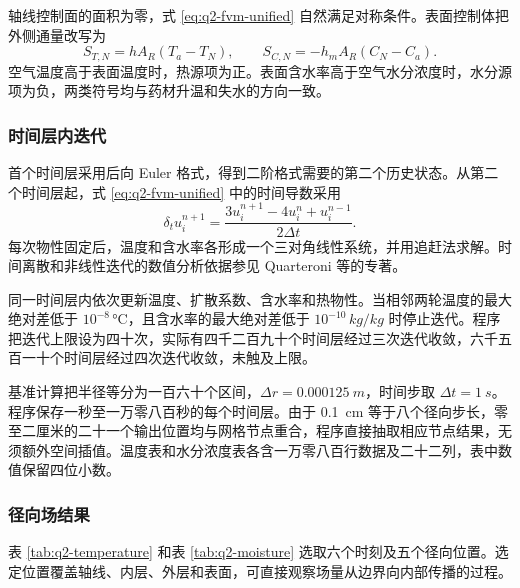 \documentclass[withoutpreface,bwprint]{cumcmthesis}
\begin{document}
轴线控制面的面积为零，式 \ref{eq:q2-fvm-unified} 自然满足对称条件。表面控制体把外侧通量改写为
\begin{equation}
S_{T,N}=hA_R\left(T_a-T_N\right),\qquad
S_{C,N}=-h_mA_R\left(C_N-C_a\right).
\label{eq:q2-surface-sources}
\end{equation}
空气温度高于表面温度时，热源项为正。表面含水率高于空气水分浓度时，水分源项为负，两类符号均与药材升温和失水的方向一致。

\subsubsection{时间层内迭代}

首个时间层采用后向 Euler 格式，得到二阶格式需要的第二个历史状态。从第二个时间层起，式 \ref{eq:q2-fvm-unified} 中的时间导数采用
\begin{equation}
\delta_t u_i^{n+1}
=
\frac{3u_i^{n+1}-4u_i^n+u_i^{n-1}}{2\Delta t}.
\label{eq:q2-bdf2}
\end{equation}
每次物性固定后，温度和含水率各形成一个三对角线性系统，并用追赶法求解。时间离散和非线性迭代的数值分析依据参见 Quarteroni 等的专著\cite{quarteroni2007}。

同一时间层内依次更新温度、扩散系数、含水率和热物性。当相邻两轮温度的最大绝对差低于 \(10^{-8}\,\si{\degreeCelsius}\)，且含水率的最大绝对差低于 \(10^{-10}\,\si{kg/kg}\) 时停止迭代。程序把迭代上限设为四十次，实际有四千二百九十个时间层经过三次迭代收敛，六千五百一十个时间层经过四次迭代收敛，未触及上限。

基准计算把半径等分为一百六十个区间，\(\Delta r=\SI{0.000125}{m}\)，时间步取 \(\Delta t=\SI{1}{s}\)。程序保存一秒至一万零八百秒的每个时间层。由于 \SI{0.1}{cm} 等于八个径向步长，零至二厘米的二十一个输出位置均与网格节点重合，程序直接抽取相应节点结果，无须额外空间插值。温度表和水分浓度表各含一万零八百行数据及二十二列，表中数值保留四位小数。

\subsubsection{径向场结果}

表 \ref{tab:q2-temperature} 和表 \ref{tab:q2-moisture} 选取六个时刻及五个径向位置。选定位置覆盖轴线、内层、外层和表面，可直接观察场量从边界向内部传播的过程。
\end{document}
